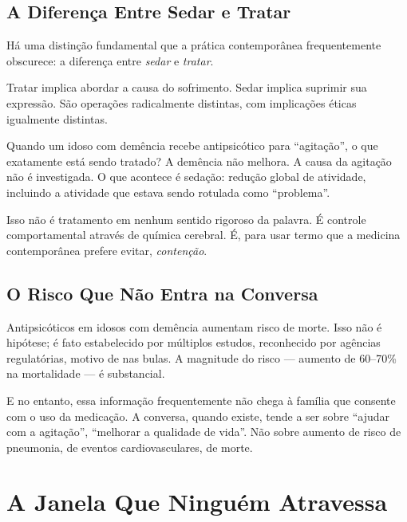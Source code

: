 \subsection{A Diferença Entre Sedar e Tratar}

Há uma distinção fundamental que a prática contemporânea frequentemente obscurece: a diferença entre \textit{sedar} e \textit{tratar}.

Tratar implica abordar a causa do sofrimento. Sedar implica suprimir sua expressão. São operações radicalmente distintas, com implicações éticas igualmente distintas.

Quando um idoso com demência recebe antipsicótico para \enquote{agitação}, o que exatamente está sendo tratado? A demência não melhora. A causa da agitação não é investigada. O que acontece é sedação: redução global de atividade, incluindo a atividade que estava sendo rotulada como \enquote{problema}.

Isso não é tratamento em nenhum sentido rigoroso da palavra. É controle comportamental através de química cerebral. É, para usar termo que a medicina contemporânea prefere evitar, \textit{contenção}.

\subsection{O Risco Que Não Entra na Conversa}

Antipsicóticos em idosos com demência aumentam risco de morte. Isso não é hipótese; é fato estabelecido por múltiplos estudos, reconhecido por agências regulatórias, motivo de  nas bulas. A magnitude do risco --- aumento de 60--70\% na mortalidade --- é substancial.

E no entanto, essa informação frequentemente não chega à família que consente com o uso da medicação. A conversa, quando existe, tende a ser sobre \enquote{ajudar com a agitação}, \enquote{melhorar a qualidade de vida}. Não sobre aumento de risco de pneumonia, de eventos cardiovasculares, de morte.

\section{A Janela Que Ninguém Atravessa}
\label{sec:janela-vazia}


